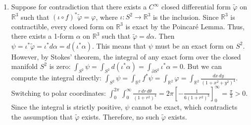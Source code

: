\documentclass{article}
\begin{document}
\begin{enumerate}[label=\fbox{\arabic*}]
\begin{enumerate}[label=(\arabic*)]
          \item Suppose for contradiction that there exists a $C^\infty$ closed differential form $\tilde{\varphi}$ on $\mathbb{R}^3$ such that $(\iota \circ f)^* \tilde{\varphi} = \varphi$, where $\iota: S^2 \to \mathbb{R}^3$ is the inclusion.
          Since $\mathbb{R}^3$ is contractible, every closed form on $\mathbb{R}^3$ is exact by the Poincaré Lemma. Thus, there exists a 1-form $\alpha$ on $\mathbb{R}^3$ such that $\tilde{\varphi} = d\alpha$.
          Then $\psi = \iota^* \tilde{\varphi} = \iota^* d\alpha = d(\iota^* \alpha)$. 
          This means that $\psi$ must be an exact form on $S^2$.
          However, by Stokes' theorem, the integral of any exact form over the closed manifold $S^2$ is zero: $\int_{S^2} \psi = \int_{S^2} d(\iota^* \alpha) = \int_{\partial S^2} \iota^* \alpha = 0$.
          But we can compute the integral directly: $\int_{S^2} \psi = \int_{\mathbb{R}^2} f^* \psi = \int_{\mathbb{R}^2} \varphi = \int_{\mathbb{R}^2} \frac{dx \, dy}{(1+x^2+y^2)^4}$.
          Switching to polar coordinates: $\int_0^{2\pi} \int_0^\infty \frac{r \, dr \, d\theta}{(1+r^2)^4} = 2\pi \left[ -\frac{1}{6(1+r^2)^3} \right]_0^\infty = \frac{\pi}{3} > 0$.
          Since the integral is strictly positive, $\psi$ cannot be exact, which contradicts the assumption that $\tilde{\varphi}$ exists. Therefore, no such $\tilde{\varphi}$ exists.
        \end{enumerate}


\end{enumerate}
\end{document}
